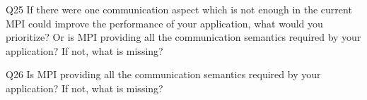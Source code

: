\begin{description}%
\item{Q25} If there were one communication aspect which is not enough in the current MPI could improve the performance of your application, what would you prioritize? Or is MPI providing all the communication semantics required by your application? If not, what is missing?%
\item{Q26} Is MPI providing all the communication semantics required by your application? If not, what is missing?%
\end{description}%
